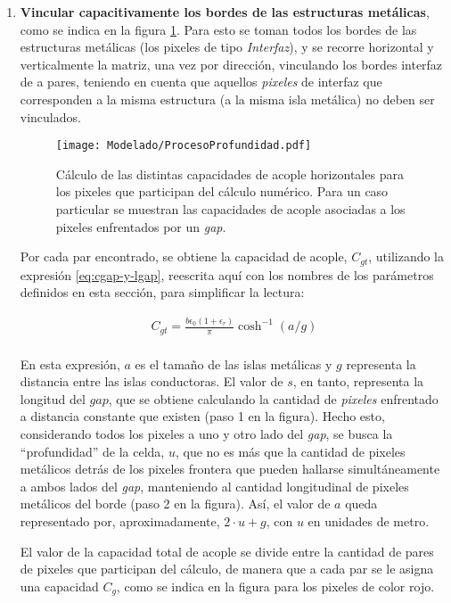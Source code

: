 \begin{enumerate}
	\item \textbf{Vincular capacitivamente los bordes de las estructuras metálicas}, como se indica en la figura \ref{fig:calculoCapacidadTLM}. Para esto se toman todos los bordes de las estructuras metálicas (los pixeles de tipo \textit{Interfaz}), y se recorre horizontal y verticalmente la matriz, una vez por dirección, vinculando los bordes interfaz de a pares, teniendo en cuenta que aquellos \textit{pixeles} de interfaz que corresponden a la misma estructura (a la misma isla metálica) no deben ser vinculados.
	
	\begin{figure}[h]
		\centering
		\texttt{[image: Modelado/ProcesoProfundidad.pdf]}
		\caption{Cálculo de las distintas capacidades de acople horizontales para los pixeles que participan del cálculo numérico. Para un caso particular se muestran las capacidades de acople asociadas a los pixeles enfrentados por un \textit{gap}.}
		\label{fig:calculoCapacidadTLM}
	\end{figure}
	
	Por cada par encontrado, se obtiene la capacidad de acople, $C_{gt}$, utilizando la expresión \ref{eq:cgap-y-lgap}, reescrita aquí con los nombres de los parámetros definidos en esta sección, para simplificar la lectura:
	
	\begin{align*}
		C_{gt} = \frac{b \epsilon_0 (1+\epsilon_r)}{\pi} \cosh^{-1} (a / g) \\
	\end{align*}
	
	En esta expresión, $a$ es el tamaño de las islas metálicas y $g$ representa la distancia entre las islas conductoras. El valor de $s$, en tanto, representa la longitud del $gap$, que se obtiene calculando la cantidad de \textit{pixeles} enfrentado a distancia constante que existen (paso 1 en la figura). Hecho esto, considerando todos los pixeles a uno y otro lado del \textit{gap}, se busca la \enquote{profundidad} de la celda, $u$, que no es más que la cantidad de pixeles metálicos detrás de los pixeles frontera que pueden hallarse simultáneamente a ambos lados del \textit{gap}, manteniendo al cantidad longitudinal de pixeles metálicos del borde (paso 2 en la figura). Así, el valor de $a$ queda representado por, aproximadamente, $2\cdot u+g$, con $u$ en unidades de metro.
	
	El valor de la capacidad total de acople se divide entre la cantidad de pares de pixeles que participan del cálculo, de manera que a cada par se le asigna una capacidad $C_g$, como se indica en la figura para los pixeles de color rojo.
	

\end{enumerate}
